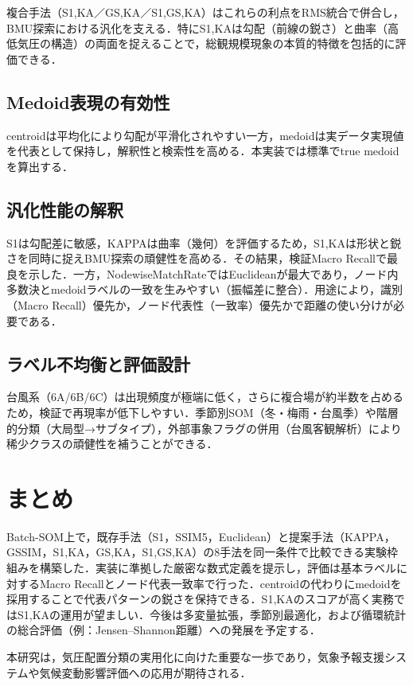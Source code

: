 \documentclass{jarticle}
\theoremstyle{definition}
\begin{document}
複合手法（S1,KA／GS,KA／S1,GS,KA）はこれらの利点をRMS統合で併合し，BMU探索における汎化を支える．特にS1,KAは勾配（前線の鋭さ）と曲率（高低気圧の構造）の両面を捉えることで，総観規模現象の本質的特徴を包括的に評価できる．

\subsection{Medoid表現の有効性}
centroidは平均化により勾配が平滑化されやすい一方，medoidは実データ実現値を代表として保持し，解釈性と検索性を高める．本実装では標準でtrue medoidを算出する．

\subsection{汎化性能の解釈}
S1は勾配差に敏感，KAPPAは曲率（幾何）を評価するため，S1,KAは形状と鋭さを同時に捉えBMU探索の頑健性を高める．その結果，検証Macro Recallで最良を示した．一方，NodewiseMatchRateではEuclideanが最大であり，ノード内多数決とmedoidラベルの一致を生みやすい（振幅差に整合）．用途により，識別（Macro Recall）優先か，ノード代表性（一致率）優先かで距離の使い分けが必要である．

\subsection{ラベル不均衡と評価設計}
台風系（6A/6B/6C）は出現頻度が極端に低く，さらに複合場が約半数を占めるため，検証で再現率が低下しやすい．季節別SOM（冬・梅雨・台風季）や階層的分類（大局型→サブタイプ），外部事象フラグの併用（台風客観解析）により稀少クラスの頑健性を補うことができる．

\section{まとめ}
Batch-SOM上で，既存手法（S1，SSIM5，Euclidean）と提案手法（KAPPA，GSSIM，S1,KA，GS,KA，S1,GS,KA）の8手法を同一条件で比較できる実験枠組みを構築した．実装に準拠した厳密な数式定義を提示し，評価は基本ラベルに対するMacro Recallとノード代表一致率で行った．centroidの代わりにmedoidを採用することで代表パターンの鋭さを保持できる．S1,KAのスコアが高く実務ではS1,KAの運用が望ましい．今後は多変量拡張，季節別最適化，および循環統計の総合評価（例：Jensen–Shannon距離）への発展を予定する．

本研究は，気圧配置分類の実用化に向けた重要な一歩であり，気象予報支援システムや気候変動影響評価への応用が期待される．



\end{document}

